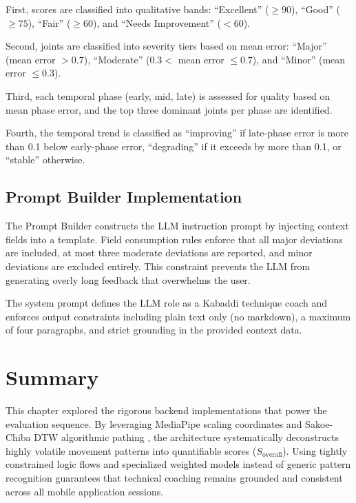 \begin{sloppypar}
First, scores are classified into qualitative bands: ``Excellent'' ($\geq 90$), ``Good'' ($\geq 75$), ``Fair'' ($\geq 60$), and ``Needs Improvement'' ($< 60$).

Second, joints are classified into severity tiers based on mean error: ``Major'' (mean error $> 0.7$), ``Moderate'' ($0.3 < $ mean error $\leq 0.7$), and ``Minor'' (mean error $\leq 0.3$).

Third, each temporal phase (early, mid, late) is assessed for quality based on mean phase error, and the top three dominant joints per phase are identified.

Fourth, the temporal trend is classified as ``improving'' if late-phase error is more than 0.1 below early-phase error, ``degrading'' if it exceeds by more than 0.1, or ``stable'' otherwise.

\subsection{Prompt Builder Implementation}

The Prompt Builder constructs the LLM instruction prompt by injecting context fields into a template. Field consumption rules enforce that all major deviations are included, at most three moderate deviations are reported, and minor deviations are excluded entirely. This constraint prevents the LLM from generating overly long feedback that overwhelms the user.

The system prompt defines the LLM role as a Kabaddi technique coach and enforces output constraints including plain text only (no markdown), a maximum of four paragraphs, and strict grounding in the provided context data.


\section{Summary}

This chapter explored the rigorous backend implementations that power the evaluation sequence. By leveraging MediaPipe \cite{mediapipe_pose} scaling coordinates and Sakoe-Chiba DTW algorithmic pathing \cite{dtw_sakoe}, the architecture systematically deconstructs highly volatile movement patterns into quantifiable scores ($S_{\text{overall}}$). Using tightly constrained logic flows and specialized weighted models instead of generic pattern recognition guarantees that technical coaching remains grounded and consistent across all mobile application sessions.

\end{sloppypar}
